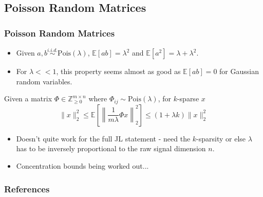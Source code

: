 \documentclass[aspectratio=34]{beamer}
\theoremstyle{plain}
\begin{document}
\subsection{Poisson Random Matrices}
\begin{frame}
    \frametitle{Poisson Random Matrices}
	\begin{itemize}
	\item Given $a,b \stackrel{i.i.d.}{\sim} \text{Pois}(\lambda)$, $\mathbb{E}[ab] = \lambda^2$ and $\mathbb{E}[a^2] = \lambda + \lambda^2$.
	\item For $\lambda << 1$, this property seems almost as good as $\mathbb{E}[ab] = 0$ for Gaussian random variables. 
	\end{itemize}
    \begin{Lemma}
    	
    Given a matrix $\Phi \in \mathbb{Z}_{\ge 0}^{m\times n}$ where $\Phi_{ij} \sim \text{Pois}(\lambda)$, for $k$-sparse $x$
    \[\|x\|_2^2 \le \mathbb{E}\left[\left\|\frac{1}{m\lambda}\Phi x\right\|_2^2\right] \le (1+\lambda k)\|x\|_2^2\]	
    \end{Lemma}
    
    \begin{itemize}
	\item Doesn't quite work for the full JL statement - need the $k$-sparsity or else $\lambda$ has to be inversely proportional to the raw signal dimension $n$. 
	\item Concentration bounds being worked out...
    \end{itemize}

\end{frame}

\begin{frame}[t,allowframebreaks]{}
\frametitle{References}



\end{frame}
\end{document}
